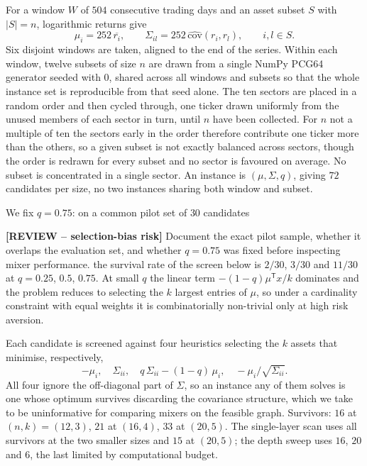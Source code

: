 For a window $W$ of $504$ consecutive trading days and an asset subset
$S$ with $|S|=n$, logarithmic returns give
\begin{equation}
  \mu_i = 252\,\overline{r_i},
  \qquad
  \Sigma_{il} = 252\,\widehat{\mathrm{cov}}(r_i,r_l),
  \qquad i,l\in S .
  \label{eq:moments}
\end{equation}
Six disjoint windows are taken, aligned to the end of the series. Within each window, twelve subsets of size $n$ are drawn from a single
NumPy PCG64 generator seeded with $0$, shared across all windows and
subsets so that the whole instance set is reproducible from that seed
alone. The ten sectors are placed in a random order and then cycled
through, one ticker drawn uniformly from the unused members of each
sector in turn, until $n$ have been collected. For $n$ not a multiple of
ten the sectors early in the order therefore contribute one ticker more
than the others, so a given subset is not exactly balanced across
sectors, though the order is redrawn for every subset and no sector is
favoured on average. No subset is concentrated in a single sector. An instance is
$(\mu,\Sigma,q)$, giving $72$ candidates per size, no two instances
sharing both window and subset.

We fix $q=0.75$: on a common pilot set of $30$ candidates

{\color{red}\textbf{[REVIEW -- selection-bias risk]} Document the exact pilot sample, whether it overlaps the evaluation set, and whether $q=0.75$ was fixed before inspecting mixer performance.}
the survival rate of the screen below is $2/30$, $3/30$
and $11/30$ at $q=0.25$, $0.5$, $0.75$. At small $q$ the linear term
$-(1-q)\mu^{\mathsf T}x/k$ dominates and the problem reduces to selecting
the $k$ largest entries of $\mu$, so under a cardinality constraint with
equal weights it is combinatorially non-trivial only at high risk
aversion.

Each candidate is screened against four heuristics selecting the $k$
assets that minimise, respectively,
\begin{equation}
  -\mu_i,\quad
  \Sigma_{ii},\quad
  q\,\Sigma_{ii}-(1-q)\,\mu_i,\quad
  -\mu_i/\sqrt{\Sigma_{ii}} .
  \label{eq:heuristics}
\end{equation}
All four ignore the off-diagonal part of $\Sigma$, so an instance any of
them solves is one whose optimum survives discarding the covariance
structure, which we take to be uninformative for comparing mixers on the
feasible graph. Survivors: $16$ at $(n,k)=(12,3)$, $21$ at $(16,4)$, $33$
at $(20,5)$. The single-layer scan uses all survivors at the two smaller
sizes and $15$ at $(20,5)$; the depth sweep uses $16$, $20$ and $6$, the
last limited by computational budget.

